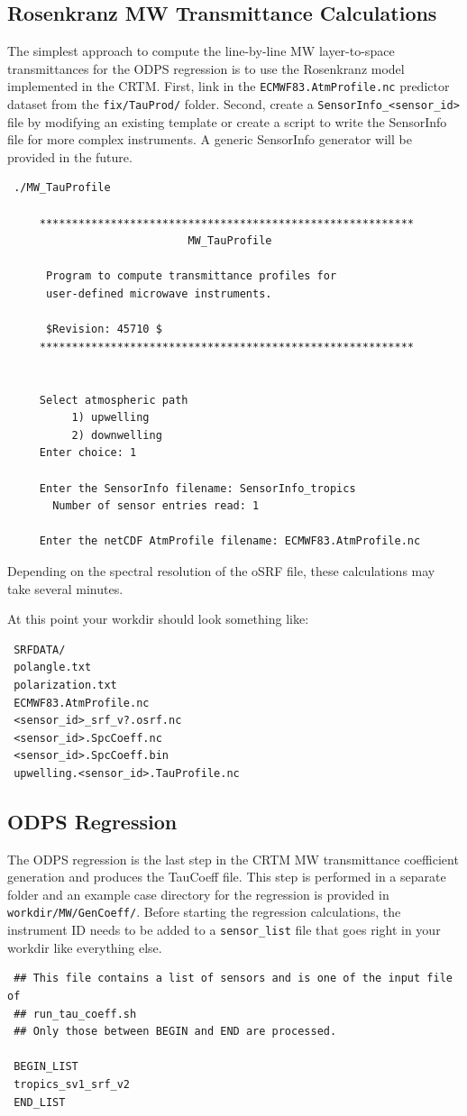 \subsection{Rosenkranz MW Transmittance Calculations}
The simplest approach to compute the line-by-line MW layer-to-space transmittances for the ODPS regression is to use the Rosenkranz model implemented in the CRTM.
First, link in the \verb|ECMWF83.AtmProfile.nc| predictor dataset from the \verb|fix/TauProd/| folder.
Second, create a \verb|SensorInfo_<sensor_id>| file by modifying an existing template or create a script to write the SensorInfo file for more complex instruments.
A generic SensorInfo generator will be provided in the future. 

\begin{verbatim}
 ./MW_TauProfile 

     **********************************************************
                            MW_TauProfile

      Program to compute transmittance profiles for 
      user-defined microwave instruments.

      $Revision: 45710 $
     **********************************************************


     Select atmospheric path
          1) upwelling  
          2) downwelling
     Enter choice: 1

     Enter the SensorInfo filename: SensorInfo_tropics
       Number of sensor entries read: 1

     Enter the netCDF AtmProfile filename: ECMWF83.AtmProfile.nc
\end{verbatim}

Depending on the spectral resolution of the oSRF file, these calculations may take several minutes.  

At this point your workdir should look something like:
\begin{verbatim}
 SRFDATA/
 polangle.txt
 polarization.txt
 ECMWF83.AtmProfile.nc
 <sensor_id>_srf_v?.osrf.nc
 <sensor_id>.SpcCoeff.nc
 <sensor_id>.SpcCoeff.bin
 upwelling.<sensor_id>.TauProfile.nc
\end{verbatim}

\subsection{ODPS Regression}
The ODPS regression is the last step in the CRTM MW transmittance coefficient generation and produces the TauCoeff file.
This step is performed in a separate folder and an example case directory for the regression is provided in \verb|workdir/MW/GenCoeff/|.
Before starting the regression calculations, the instrument ID needs to be added to a \verb|sensor_list| file that goes right in your workdir like everything else. 
\begin{verbatim}
 ## This file contains a list of sensors and is one of the input file of
 ## run_tau_coeff.sh
 ## Only those between BEGIN and END are processed.

 BEGIN_LIST
 tropics_sv1_srf_v2
 END_LIST
\end{verbatim}


